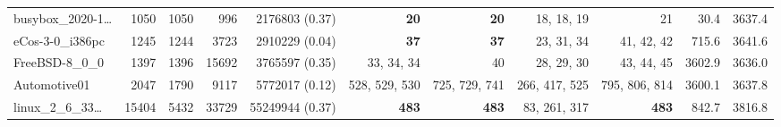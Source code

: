 \begin{table*}
\begin{tiny}
{{\begin{tabular}{lrrrrrrrrrr}
busybox\_2020-1\ldots & \num[text-series-to-math=true]{1050} & \num[text-series-to-math=true]{1050} & \num[text-series-to-math=true]{996} & \num[text-series-to-math=true]{2176803} (\num[text-series-to-math=true]{0.37}) & \textbf{\num[text-series-to-math=true]{20}} & \textbf{\num[text-series-to-math=true]{20}} & \num[text-series-to-math=true]{18}, \num[text-series-to-math=true]{18}, \num[text-series-to-math=true]{19} & \num[text-series-to-math=true]{21} & 30.4 & 3637.4\\
eCos-3-0\_i386pc & \num[text-series-to-math=true]{1245} & \num[text-series-to-math=true]{1244} & \num[text-series-to-math=true]{3723} & \num[text-series-to-math=true]{2910229} (\num[text-series-to-math=true]{0.04}) & \textbf{\num[text-series-to-math=true]{37}} & \textbf{\num[text-series-to-math=true]{37}} & \num[text-series-to-math=true]{23}, \num[text-series-to-math=true]{31}, \num[text-series-to-math=true]{34} & \num[text-series-to-math=true]{41}, \num[text-series-to-math=true]{42}, \num[text-series-to-math=true]{42} & 715.6 & 3641.6\\
FreeBSD-8\_0\_0 & \num[text-series-to-math=true]{1397} & \num[text-series-to-math=true]{1396} & \num[text-series-to-math=true]{15692} & \num[text-series-to-math=true]{3765597} (\num[text-series-to-math=true]{0.35}) & \num[text-series-to-math=true]{33}, \num[text-series-to-math=true]{34}, \num[text-series-to-math=true]{34} & \num[text-series-to-math=true]{40} & \num[text-series-to-math=true]{28}, \num[text-series-to-math=true]{29}, \num[text-series-to-math=true]{30} & \num[text-series-to-math=true]{43}, \num[text-series-to-math=true]{44}, \num[text-series-to-math=true]{45} & 3602.9 & 3636.0\\
Automotive01 & \num[text-series-to-math=true]{2047} & \num[text-series-to-math=true]{1790} & \num[text-series-to-math=true]{9117} & \num[text-series-to-math=true]{5772017} (\num[text-series-to-math=true]{0.12}) & \num[text-series-to-math=true]{528}, \num[text-series-to-math=true]{529}, \num[text-series-to-math=true]{530} & \num[text-series-to-math=true]{725}, \num[text-series-to-math=true]{729}, \num[text-series-to-math=true]{741} & \num[text-series-to-math=true]{266}, \num[text-series-to-math=true]{417}, \num[text-series-to-math=true]{525} & \num[text-series-to-math=true]{795}, \num[text-series-to-math=true]{806}, \num[text-series-to-math=true]{814} & 3600.1 & 3637.8\\
linux\_2\_6\_33\ldots & \num[text-series-to-math=true]{15404} & \num[text-series-to-math=true]{5432} & \num[text-series-to-math=true]{33729} & \num[text-series-to-math=true]{55249944} (\num[text-series-to-math=true]{0.37}) & \textbf{\num[text-series-to-math=true]{483}} & \textbf{\num[text-series-to-math=true]{483}} & \num[text-series-to-math=true]{83}, \num[text-series-to-math=true]{261}, \num[text-series-to-math=true]{317} & \textbf{\num[text-series-to-math=true]{483}} & 842.7 & 3816.8\\

\end{tabular}}}
\end{tiny}
\end{table*}

